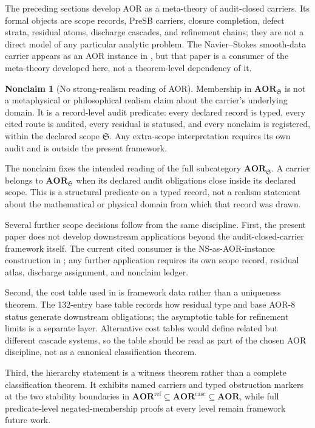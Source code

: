 \documentclass[11pt]{article}
\newcommand{\AOR}{\mathbf{AOR}}
\newcommand{\CascadeStableAOR}{\mathbf{AOR}^{\mathrm{casc}}}
\newcommand{\RefStableAOR}{\mathbf{AOR}^{\mathrm{ref}}}
\theoremstyle{definition}
\newtheorem{nonclaim}[theorem]{Nonclaim}
\begin{document}
The preceding sections develop AOR as a meta-theory of audit-closed
carriers.  Its formal objects are scope records, PreSB carriers,
closure completion, defect strata, residual atoms, discharge
cascades, and refinement chains; they are not a direct model of any
particular analytic problem.  The Navier--Stokes smooth-data carrier
appears as an AOR instance in \citet{Tsiokos2026NavierStokes}, but
that paper is a consumer of the meta-theory developed here, not a
theorem-level dependency of it.

\begin{nonclaim}[No strong-realism reading of AOR]\label{nonclaim:aor:no-strong-realism}
Membership in $\AOR_{\mathfrak S}$ is not a metaphysical or
philosophical realism claim about the carrier's underlying domain.  It
is a record-level audit predicate: every declared record is typed,
every cited route is audited, every residual is statused, and every
nonclaim is registered, within the declared scope $\mathfrak S$.  Any
extra-scope interpretation requires its own audit and is outside the
present framework.
\end{nonclaim}

The nonclaim fixes the intended reading of the full subcategory
$\AOR_{\mathfrak S}$.  A carrier belongs to $\AOR_{\mathfrak S}$ when
its declared audit obligations close inside its declared scope.  This
is a structural predicate on a typed record, not a realism statement
about the mathematical or physical domain from which that record was
drawn.

Several further scope decisions follow from the same discipline.  First,
the present paper does not develop downstream applications beyond the
audit-closed-carrier framework itself.  The current cited consumer is
the NS-as-AOR-instance construction in
\citet{Tsiokos2026NavierStokes}; any further application requires its
own scope record, residual atlas, discharge assignment, and nonclaim
ledger.

Second, the cost table used in  is
framework data rather than a uniqueness theorem.  The 132-entry base
table records how residual type and base AOR-8 status generate
downstream obligations; the asymptotic table for refinement limits is a
separate layer.  Alternative cost tables would define related but
different cascade systems, so the table should be read as part of the
chosen AOR discipline, not as a canonical classification theorem.

Third, the hierarchy statement  is a witness
theorem rather than a complete classification theorem.  It exhibits
named carriers and typed obstruction markers at the two stability
boundaries in
$\RefStableAOR \subseteq \CascadeStableAOR \subseteq \AOR$, while full
predicate-level negated-membership proofs at every level remain
framework future work.
\end{document}
